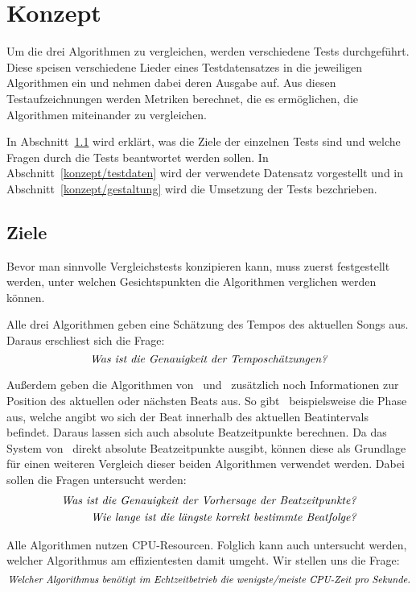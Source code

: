 \chapter{Konzept}
\label{konzept}

Um die drei Algorithmen zu vergleichen,
	werden verschiedene Tests durchgeführt.
Diese speisen verschiedene Lieder eines Testdatensatzes in die jeweiligen Algorithmen ein
	und nehmen dabei deren Ausgabe auf.
Aus diesen Testaufzeichnungen werden Metriken berechnet,
	die es ermöglichen,
	die Algorithmen miteinander zu vergleichen.

In Abschnitt~\ref{konzept/ziele} wird erklärt,
	was die Ziele der einzelnen Tests sind
	und welche Fragen durch die Tests beantwortet werden sollen.
In Abschnitt~\ref{konzept/testdaten} wird der verwendete Datensatz vorgestellt
	und in Abschnitt~\ref{konzept/gestaltung} wird die Umsetzung der Tests bezchrieben.


\section{Ziele} \label{konzept/ziele}
{
	Bevor man sinnvolle Vergleichstests konzipieren kann,
		muss zuerst festgestellt werden,
		unter welchen Gesichtspunkten die Algorithmen verglichen werden können.

	Alle drei Algorithmen geben eine Schätzung des Tempos des aktuellen Songs aus.
	Daraus erschliest sich die Frage:
	\begin{equation}
		\text{\emph{Was ist die Genauigkeit der Temposchätzungen?}}
	\end{equation}

	Außerdem geben die Algorithmen von~\cite{2009_DaPlSt} und~\cite{2011_PlRoSt} zusätzlich noch Informationen zur Position des aktuellen oder nächsten Beats aus.
	So gibt~\cite{2011_PlRoSt} beispielsweise die Phase aus,
		welche angibt wo sich der Beat innerhalb des aktuellen Beatintervals befindet.
	Daraus lassen sich auch absolute Beatzeitpunkte berechnen.
	Da das System von~\cite{2009_DaPlSt} direkt absolute Beatzeitpunkte ausgibt,
		können diese als Grundlage für einen weiteren Vergleich dieser beiden Algorithmen verwendet werden.
	Dabei sollen die Fragen untersucht werden:
	\begin{align}
		\text{\emph{Was ist die Genauigkeit der Vorhersage der Beatzeitpunkte?}} \\
		\text{\emph{Wie lange ist die längste korrekt bestimmte Beatfolge?}}
	\end{align}

	Alle Algorithmen nutzen CPU-Resourcen.
	Folglich kann auch untersucht werden,
		welcher Algorithmus am effizientesten damit umgeht.
	Wir stellen uns die Frage:
	\begin{equation}
		\text{\emph{Welcher Algorithmus benötigt im Echtzeitbetrieb die wenigste/meiste CPU-Zeit pro Sekunde.}}
	\end{equation}
}

